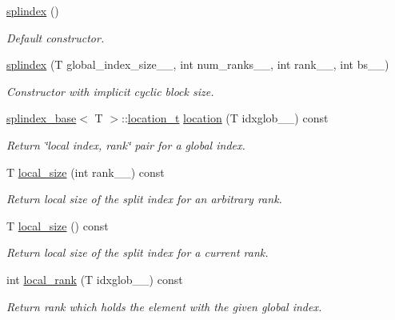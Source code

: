 \begin{DoxyCompactItemize}
\item 
\hyperlink{classsddk_1_1splindex_3_01block__cyclic_00_01_t_01_4_a859976665bf4329207eba8005671cc7e}{splindex} ()
\begin{DoxyCompactList}\small\item\em Default constructor. \end{DoxyCompactList}\item 
\hyperlink{classsddk_1_1splindex_3_01block__cyclic_00_01_t_01_4_a876bbbb3a8f500922a94b3e287704ae0}{splindex} (T global\+\_\+index\+\_\+size\+\_\+\+\_\+, int num\+\_\+ranks\+\_\+\+\_\+, int rank\+\_\+\+\_\+, int bs\+\_\+\+\_\+)
\begin{DoxyCompactList}\small\item\em Constructor with implicit cyclic block size. \end{DoxyCompactList}\item 
\hyperlink{classsddk_1_1splindex__base}{splindex\+\_\+base}$<$ T $>$\+::\hyperlink{structsddk_1_1splindex__base_1_1location__t}{location\+\_\+t} \hyperlink{classsddk_1_1splindex_3_01block__cyclic_00_01_t_01_4_aa22799f8dae197acf3a132c97421a3d3}{location} (T idxglob\+\_\+\+\_\+) const 
\begin{DoxyCompactList}\small\item\em Return \char`\"{}local index, rank\char`\"{} pair for a global index. \end{DoxyCompactList}\item 
T \hyperlink{classsddk_1_1splindex_3_01block__cyclic_00_01_t_01_4_a7d97a8738db927b0140470e124722b56}{local\+\_\+size} (int rank\+\_\+\+\_\+) const 
\begin{DoxyCompactList}\small\item\em Return local size of the split index for an arbitrary rank. \end{DoxyCompactList}\item 
T \hyperlink{classsddk_1_1splindex_3_01block__cyclic_00_01_t_01_4_a556e6a2d2a09e2b5763f815406023052}{local\+\_\+size} () const 
\begin{DoxyCompactList}\small\item\em Return local size of the split index for a current rank. \end{DoxyCompactList}\item 
int \hyperlink{classsddk_1_1splindex_3_01block__cyclic_00_01_t_01_4_ad7b1b50ee952f4e855bf3b300b82fb0f}{local\+\_\+rank} (T idxglob\+\_\+\+\_\+) const 
\begin{DoxyCompactList}\small\item\em Return rank which holds the element with the given global index. \end{DoxyCompactList}\item 

\end{DoxyCompactItemize}
